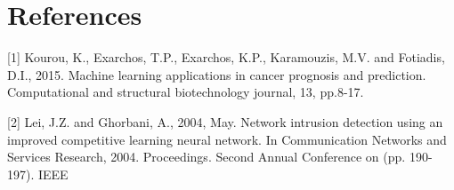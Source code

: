 \documentclass{article}
\begin{document}
\section{References}
\hspace{0.37cm} [1] Kourou, K., Exarchos, T.P., Exarchos, K.P., Karamouzis, M.V. and Fotiadis, D.I., 2015. Machine learning applications in
    cancer prognosis and prediction. Computational and structural biotechnology journal, 13, pp.8-17.

[2] Lei, J.Z. and Ghorbani, A., 2004, May. Network intrusion detection using an improved competitive learning neural network. 
    In Communication Networks and Services Research, 2004. Proceedings. Second Annual Conference on (pp. 190-197). IEEE
\end{document}
